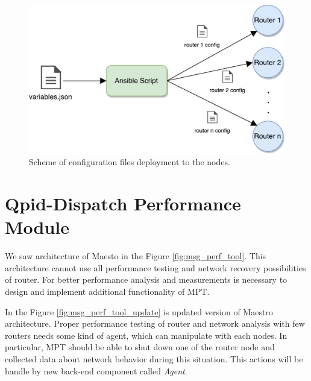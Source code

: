 \begin{figure}[H]
  \centering
  \includegraphics[width=12cm]{obrazky-figures/deployment.pdf}
  \caption{Scheme of configuration files deployment to the nodes.}
  \label{fig:deployment}
\end{figure}


\section{Qpid-Dispatch Performance Module}
We saw architecture of Maesto in the Figure \ref{fig:msg_perf_tool}. This architecture cannot use all performance testing and network recovery possibilities of router. For better performance analysis and measurements is necessary to design and implement additional functionality of MPT.

In the Figure \ref{fig:msg_perf_tool_update} is updated version of Maestro architecture. Proper performance testing of router and network analysis with few routers needs some kind of agent, which can manipulate with each nodes. In particular, MPT should be able to shut down one of the router node and collected data about network behavior during this situation. This actions will be handle by new back-end component called \emph{Agent}.

